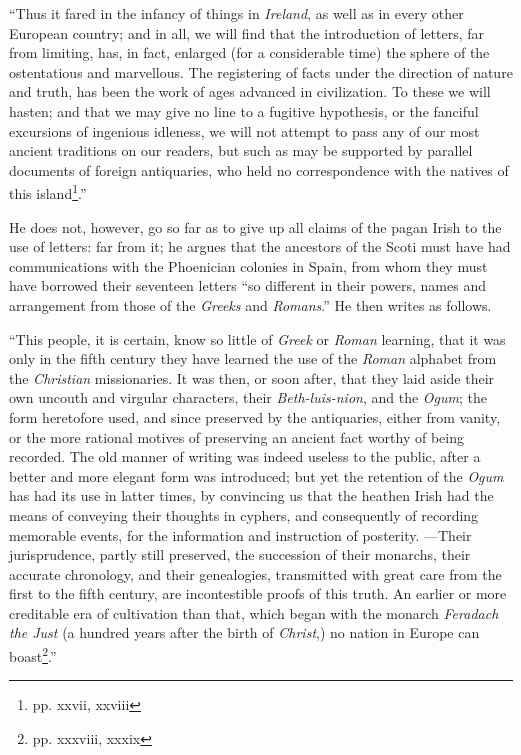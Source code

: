 \documentclass[11pt,oneside]{memoir}
\begin{document}
``Thus it fared in the infancy of things in \textit{Ireland}, as well as in every other European country; and in all, we will find that the introduction of letters, far from limiting, has, in fact, enlarged (for a considerable time) the sphere of the ostentatious and marvellous.
The registering of facts under the direction of nature and truth, has been the work of ages advanced in civilization.
To these we will hasten; and that we may give no line to a fugitive hypothesis, or the fanciful excursions of ingenious idleness, we will not attempt to pass any of our most ancient traditions on our readers, but such as may be supported by parallel documents of foreign antiquaries, who held no correspondence with the natives of this island\footnote{pp. xxvii, xxviii}.'' 

He does not, however, go so far as to give up all claims of the pagan Irish to the use of letters: far from it; he argues that the ancestors of the Scoti must have had communications with the Phoenician colonies in Spain, from whom they must have borrowed their seventeen letters ``so different in their powers, names and arrangement from those of the \textit{Greeks} and \textit{Romans}.''
He then writes as follows.

``This people, it is certain, know so little of \textit{Greek} or \textit{Roman} learning, that it was only in the fifth century they have learned the use of the \textit{Roman} alphabet from the \textit{Christian} missionaries.
It was then, or soon after, that they laid aside their own uncouth and virgular characters, their \textit{Beth-luis-nion}, and the \textit{Ogum}; the form heretofore used, and since preserved by the antiquaries, either from vanity, or the more rational motives of preserving an ancient fact worthy of being recorded.
The old manner of writing was indeed useless to the public, after a better and more elegant form was introduced; but yet the retention of the \textit{Ogum} has had its use in latter times, by convincing us that the heathen Irish had the means of conveying their thoughts in cyphers, and consequently of recording memorable events, for the information and instruction of posterity.
---Their jurisprudence, partly still preserved, the succession of their monarchs, their accurate chronology, and their genealogies, transmitted with great care from the first to the fifth century, are incontestible proofs of this truth.
An earlier or more creditable era of cultivation than that, which began with the monarch \textit{Feradach the Just} (a hundred years after the birth of \textit{Christ},) no nation in Europe can boast\footnote{
    pp. xxxviii, xxxix
}.'' 
\end{document}
